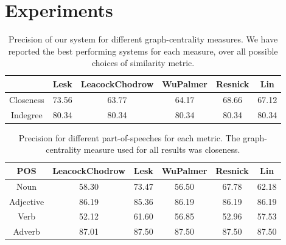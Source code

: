 \documentclass[12pt,letterpaper]{article}
\begin{document}
\section{Experiments}
\label{sec:experiments}
\label{sec:experimental-results}
\begin{table} 
\centering
\begin{tabular}{|c|c|c|c|c|c|}
  & Lesk & LeacockChodrow & WuPalmer & Resnick & Lin  \\
\hline
Closeness & 73.56 & 63.77 & 64.17 & 68.66 & 67.12\\
Indegree & 80.34 & 80.34 & 80.34 & 80.34 & 80.34 \\
\end{tabular}
\caption{Precision of our system for different graph-centrality measures. We have reported the best performing systems for each measure, over all possible choices of similarity metric.}
\label{table:1}
\end{table}

\begin{table}  
\centering
\begin{tabular}{|c|c|c|c|c|c|}
POS & LeacockChodrow & Lesk & WuPalmer & Resnick & Lin  \\
\hline
Noun & 58.30 & 73.47 & 56.50& 67.78 & 62.18\\
Adjective & 86.19 & 85.36 & 86.19 & 86.19 & 86.19\\
Verb & 52.12 & 61.60 & 56.85 & 52.96 & 57.53\\
Adverb & 87.01 & 87.50 & 87.50 & 87.50 & 87.50\\
\end{tabular}
\caption{Precision for different part-of-speeches for each metric. The graph-centrality measure used for all results was closeness.}
\label{table:2}
\end{table}
\end{document}
